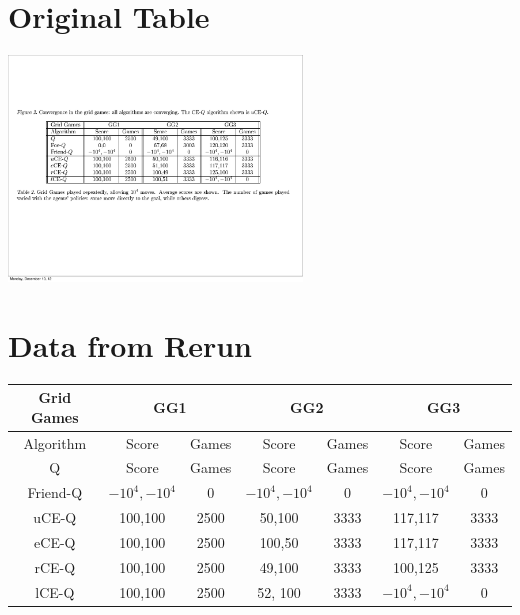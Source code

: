 \section{Original Table}
\includegraphics[height=60mm]{text/pic_CEQ.pdf}


\section{Data from Rerun}
\begin{tabular}{||c||c|c||c|c||c|c||}
	\hline
	Grid Games&  \multicolumn{2}{|c||}{GG1} &
	 \multicolumn{2}{|c||}{GG2}  & \multicolumn{2}{|c||}{GG3}  \\ \hline
	Algorithm & Score & Games & Score & Games & Score & Games \\ \hline \hline
	Q & Score & Games & Score & Games & Score & Games \\ \hline
	Friend-Q & $-10^{4},-10^{4}$ & 0 & $-10^{4},-10^{4}$ & 0 & $-10^{4},-10^{4}$ & 0 \\ \hline \hline
	uCE-Q & 100,100 & 2500 & 50,100 & 3333 & 117,117 & 3333 \\ \hline
	eCE-Q & 100,100 & 2500 & 100,50 & 3333 & 117,117 & 3333 \\ \hline
	rCE-Q & 100,100 & 2500 & 49,100 & 3333 & 100,125 & 3333 \\ \hline \hline
	lCE-Q & 100,100 & 2500 & 52, 100 & 3333 & $-10^{4},-10^{4}$ & 0 \\ \hline 
	
\end{tabular}